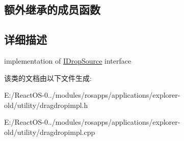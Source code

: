 \subsection*{额外继承的成员函数}


\subsection{详细描述}
implementation of \hyperlink{interface_i_drop_source}{I\+Drop\+Source} interface 

该类的文档由以下文件生成\+:\begin{DoxyCompactItemize}
\item 
E\+:/\+React\+O\+S-\/0../modules/rosapps/applications/explorer-\/old/utility/dragdropimpl.\+h\item 
E\+:/\+React\+O\+S-\/0../modules/rosapps/applications/explorer-\/old/utility/dragdropimpl.\+cpp\end{DoxyCompactItemize}
